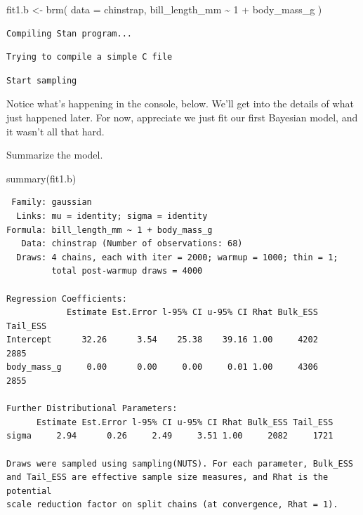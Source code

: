 \documentclass[
  letterpaper,
  DIV=11,
  numbers=noendperiod]{scrartcl}
\newenvironment{Shaded}{\begin{snugshade}}{\end{snugshade}}
\newcommand{\AttributeTok}[1]{\textcolor[rgb]{0.40,0.45,0.13}{#1}}
\newcommand{\DecValTok}[1]{\textcolor[rgb]{0.68,0.00,0.00}{#1}}
\newcommand{\FunctionTok}[1]{\textcolor[rgb]{0.28,0.35,0.67}{#1}}
\newcommand{\NormalTok}[1]{\textcolor[rgb]{0.00,0.23,0.31}{#1}}
\newcommand{\OtherTok}[1]{\textcolor[rgb]{0.00,0.23,0.31}{#1}}
\newcommand{\SpecialCharTok}[1]{\textcolor[rgb]{0.37,0.37,0.37}{#1}}
\begin{document}
\begin{Shaded}
\begin{Highlighting}[]
\NormalTok{fit1.b }\OtherTok{\textless{}{-}} \FunctionTok{brm}\NormalTok{(}
  \AttributeTok{data =}\NormalTok{ chinstrap,}
\NormalTok{  bill\_length\_mm }\SpecialCharTok{\textasciitilde{}} \DecValTok{1} \SpecialCharTok{+}\NormalTok{ body\_mass\_g}
\NormalTok{)}
\end{Highlighting}
\end{Shaded}

\begin{verbatim}
Compiling Stan program...
\end{verbatim}

\begin{verbatim}
Trying to compile a simple C file
\end{verbatim}

\begin{verbatim}
Start sampling
\end{verbatim}

Notice what's happening in the console, below. We'll get into the
details of what just happened later. For now, appreciate we just fit our
first Bayesian model, and it wasn't all that hard.

Summarize the model.

\begin{Shaded}
\begin{Highlighting}[]
\FunctionTok{summary}\NormalTok{(fit1.b)}
\end{Highlighting}
\end{Shaded}

\begin{verbatim}
 Family: gaussian 
  Links: mu = identity; sigma = identity 
Formula: bill_length_mm ~ 1 + body_mass_g 
   Data: chinstrap (Number of observations: 68) 
  Draws: 4 chains, each with iter = 2000; warmup = 1000; thin = 1;
         total post-warmup draws = 4000

Regression Coefficients:
            Estimate Est.Error l-95% CI u-95% CI Rhat Bulk_ESS Tail_ESS
Intercept      32.26      3.54    25.38    39.16 1.00     4202     2885
body_mass_g     0.00      0.00     0.00     0.01 1.00     4306     2855

Further Distributional Parameters:
      Estimate Est.Error l-95% CI u-95% CI Rhat Bulk_ESS Tail_ESS
sigma     2.94      0.26     2.49     3.51 1.00     2082     1721

Draws were sampled using sampling(NUTS). For each parameter, Bulk_ESS
and Tail_ESS are effective sample size measures, and Rhat is the potential
scale reduction factor on split chains (at convergence, Rhat = 1).
\end{verbatim}
\end{document}
